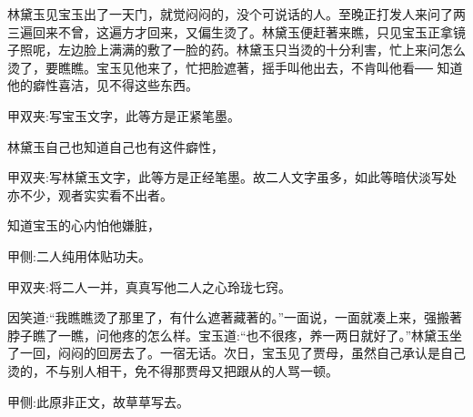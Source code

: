 \begin{parag}
    林黛玉见宝玉出了一天门，就觉闷闷的，没个可说话的人。至晚正打发人来问了两三遍回来不曾，这遍方才回来，又偏生烫了。林黛玉便赶著来瞧，只见宝玉正拿镜子照呢，左边脸上满满的敷了一脸的药。林黛玉只当烫的十分利害，忙上来问怎么烫了，要瞧瞧。宝玉见他来了，忙把脸遮著，摇手叫他出去，不肯叫他看── 知道他的癖性喜洁，见不得这些东西。\begin{note}甲双夹:写宝玉文字，此等方是正紧笔墨。\end{note}林黛玉自己也知道自己也有这件癖性，\begin{note}甲双夹:写林黛玉文字，此等方是正经笔墨。故二人文字虽多，如此等暗伏淡写处亦不少，观者实实看不出者。\end{note}知道宝玉的心内怕他嫌脏，\begin{note}甲侧:二人纯用体贴功夫。\end{note}\begin{note}甲双夹:将二人一并，真真写他二人之心玲珑七窍。\end{note}因笑道:“我瞧瞧烫了那里了，有什么遮著藏著的。”一面说，一面就凑上来，强搬著脖子瞧了一瞧，问他疼的怎么样。宝玉道:“也不很疼，养一两日就好了。”林黛玉坐了一回，闷闷的回房去了。一宿无话。次日，宝玉见了贾母，虽然自己承认是自己烫的，不与别人相干，免不得那贾母又把跟从的人骂一顿。\begin{note}甲侧:此原非正文，故草草写去。\end{note}
\end{parag}


